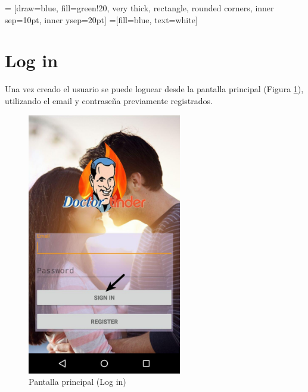 \documentclass[10pt,letterpaper,extrafontsizes]{memoir}
\begin{document}
\begin{center}
 = [draw=blue, fill=green!20, very thick,
    rectangle, rounded corners, inner sep=10pt, inner ysep=20pt]
 =[fill=blue, text=white]
\end{center}
%
\section{Log in}

Una vez creado el usuario se puede loguear desde la pantalla principal (Figura \ref{fig:ppal}), utilizando el email y contraseña previamente registrados.

\begin{figure}[H]
    \centering
\includegraphics[width=0.6\textwidth]{graficos/capturas/k}
    \caption{Pantalla principal (Log in)}
    \label{fig:ppal}
\end{figure}
\end{document}
